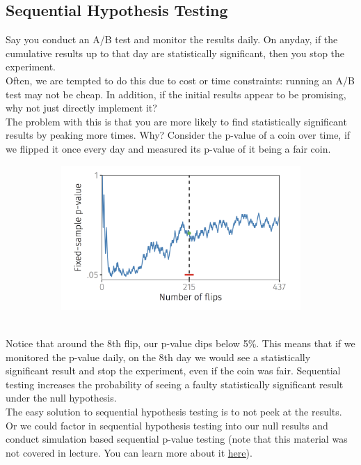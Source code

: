 \documentclass{article}
\begin{document}
\subsection{Sequential Hypothesis Testing}
Say you conduct an A/B test and monitor the results daily. 
On anyday, if the cumulative results up to that day are statistically significant, then you stop the experiment.
\\
Often, we are tempted to do this due to cost or time constraints: running an A/B test may not be cheap. 
In addition, if the initial results appear to be promising, why not just directly implement it? 
\\
The problem with this is that you are more likely to find statistically significant results by peaking more times. 
Why? 
Consider the p-value of a coin over time, if we flipped it once every day and measured its p-value of it being a fair coin.
\\
\begin{figure}[h!]
  \centering
  \begin{subfigure}{0.4\linewidth}
    \includegraphics[width=\linewidth]{Sequential.jpg}
  \end{subfigure} 
\end{figure}
\\
Notice that around the 8th flip, our p-value dips below 5\%. 
This means that if we monitored the p-value daily, on the 8th day we would see a statistically significant result and stop the experiment, even if the coin was fair. 
Sequential testing increases the probability of seeing a faulty statistically significant result under the null hypothesis.
\\ 
The easy solution to sequential hypothesis testing is to not peek at the results. 
\\
Or we could factor in sequential hypothesis testing into our null results and conduct simulation based sequential p-value testing (note that this material was not covered in lecture. You can learn more about it \underline{\href{http://www.ds100.org/sp18/assets/lectures/lec28/28-randomized-experiments-ab-testing.pdf}{here}}).
\end{document}
